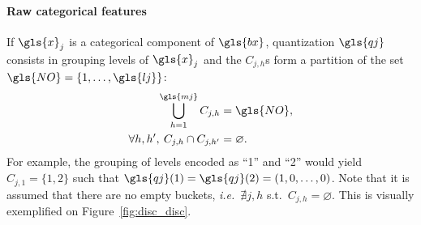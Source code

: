 \paragraph{Raw categorical features} If $\gls{x}_j$ is a categorical component of $\gls{bx}$, quantization $\gls{qj}$ consists in grouping levels of $\gls{x}_j$ and the $C_{j,h}$s form a partition of the set $\gls{NO} = \{1, \dots, \gls{lj}\}$:
\begin{align*}
\bigcup_{h=1}^{\gls{mj}}C_{j,h} & = \gls{NO}, \\
\forall h, h', \: C_{j,h} \cap C_{j,h'} & = \varnothing .
\end{align*}
For example, the grouping of levels encoded as ``1'' and ``2'' would yield $C_{j,1} = \{1,2\}$ such that $\gls{qj}(1) = \gls{qj}(2) = (1,0,\ldots,0)$. Note that it is assumed that there are no empty buckets, \textit{i.e.}\ $\nexists j, h$ s.t.\ $C_{j,h} = \varnothing$.
This is visually exemplified on Figure~\ref{fig:disc_disc}.

